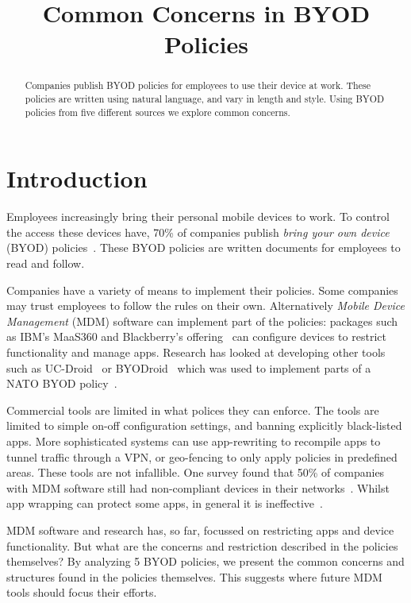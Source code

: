 \documentclass[conference,twocolumn]{IEEEtran}
\title{Common Concerns in BYOD Policies}
\author{%
  \IEEEauthorblockN{Joseph Hallett}
  \IEEEauthorblockA{University of Edinburgh}
  \and
  \IEEEauthorblockN{David Aspinall}
  \IEEEauthorblockA{University of Edinburgh}
}
\begin{document}
\maketitle

\begin{abstract}
  Companies publish BYOD policies for employees to use their device at work.
  These policies are written using natural language, and vary in length and style.
  Using BYOD policies from five different sources we explore common concerns.
\end{abstract}

\section{Introduction}
\label{sec:introduction}

Employees increasingly bring their personal mobile devices to work.
To control the access these devices have, 70\% of companies publish \emph{bring your own device} (BYOD) policies~\cite{schulze_byod_2016}.
These BYOD policies are written documents for employees to read and follow.

Companies have a variety of means to implement their policies.
Some companies may trust employees to follow the rules on their own.
Alternatively \emph{Mobile Device Management} (MDM) software can implement part of the policies: packages such as IBM's MaaS360 and Blackberry's offering~\cite{_ibm_????,_secure_????} can configure devices to restrict functionality and manage apps.
Research has looked at developing other tools such as UC-Droid~\cite{martinelli_enhancing_2016} or BYODroid~\cite{armando_enabling_2014} which was used to implement parts of a NATO BYOD policy~\cite{armando_developing_2016}.

Commercial tools are limited in what polices they can enforce.
The tools are limited to simple on-off configuration settings, and banning explicitly black-listed apps.
More sophisticated systems can use app-rewriting to recompile apps to tunnel traffic through a VPN, or geo-fencing to only apply policies in predefined areas.
These tools are not infallible.
One survey found that 50\% of companies with MDM software still had non-compliant devices in their networks~\cite{mobileiron_security_labs_q4_2015}.
Whilst app wrapping can protect some apps, in general it is ineffective~\cite{hao_effectiveness_2013}.

MDM software and research has, so far, focussed on restricting apps and device functionality.
But what are the concerns and restriction described in the policies themselves?
By analyzing 5 BYOD policies, we present the common concerns and structures found in the policies themselves.
This suggests where future MDM tools should focus their efforts.
\end{document}
